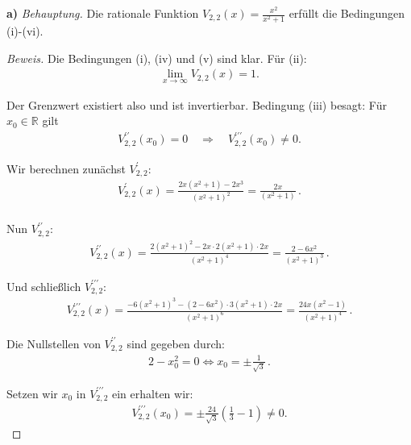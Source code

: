 \documentclass[a4paper]{article}
\newcommand{\R}{\mathbb{R}}
\newcommand{\beh}{\textit{Behauptung. }}
\begin{document}
\textbf{a)} \beh Die rationale Funktion $V_{2,2}(x) = \frac{x^2}{x^2 + 1}$ erfüllt die Bedingungen (i)-(vi).
\begin{proof}[Beweis]
    Die Bedingungen (i), (iv) und (v) sind klar. Für (ii): 
    \begin{align*}
        \lim_{x\to\infty} V_{2,2}(x) = 1. 
    \end{align*}

    Der Grenzwert existiert also und ist invertierbar. 
    Bedingung (iii) besagt: Für $x_0\in\R$ gilt
    \begin{align*}
        V_{2,2}^{\prime\prime}(x_0) = 0 \quad\Longrightarrow\quad V_{2,2}^{\prime\prime\prime}(x_0) \neq 0.
    \end{align*}

    Wir berechnen zunächst $V_{2,2}^{\prime}$: 
    \begin{align*}
        V_{2,2}^{\prime}(x) = \frac{2x(x^2+1)-2x^3}{(x^2+1)^2} = \frac{2x}{(x^2+1)} \,. \\
    \end{align*}

    Nun $V_{2,2}^{\prime\prime}$:
    \begin{align*}
        V_{2,2}^{\prime\prime}(x) = \frac{2(x^2+1)^2 - 2x\cdot 2 (x^2+1)\cdot 2x}{(x^2+1)^4} 
                                  = \frac{2-6x^2}{(x^2+1)^3} \,. 
    \end{align*}
    
    Und schließlich $V_{2,2}^{\prime\prime\prime}$:
    \begin{align*}
        V_{2,2}^{\prime\prime\prime}(x) = \frac{-6(x^2+1)^3 - (2-6x^2)\cdot 3(x^2 + 1)\cdot 2x}{(x^2+1)^6} 
                                        = \frac{24x(x^2-1)}{(x^2+1)^4} \,.
    \end{align*}

    Die Nullstellen von $V_{2,2}^{\prime\prime}$ sind gegeben durch:
    \begin{align*}
        2 - x_0^2 = 0 \Longleftrightarrow x_0 = \pm\frac{1}{\sqrt{3}} \,.
    \end{align*}

    Setzen wir $x_0$ in $V_{2,2}^{\prime\prime\prime}$ ein erhalten wir:
    \begin{align*}
        V_{2,2}^{\prime\prime\prime}(x_0) = \pm \frac{24}{\sqrt{3}}\left(\frac{1}{3} - 1\right) \neq 0.
    \end{align*}


\end{proof}
\end{document}
